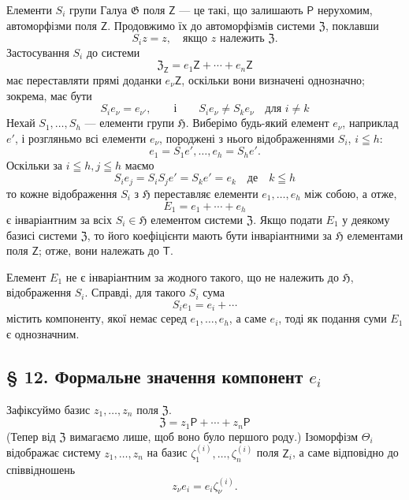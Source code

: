 \documentclass[11pt]{article}
\begin{document}
Елементи \(S_i\) групи Галуа \(\mathfrak G\) поля \(\mathsf Z\) --- це такі, що залишають \(\mathsf P\) нерухомим, автоморфізми поля \(\mathsf Z\). Продовжимо їх до автоморфізмів системи \(\mathfrak Z\), поклавши
\[
S_i z=z,\quad \text{якщо } z \text{ належить } \mathfrak Z.
\]
Застосування \(S_i\) до системи
\[
\mathfrak Z_{\mathsf Z}=e_1\mathsf Z+\cdots+e_n\mathsf Z
\]
має переставляти прямі доданки \(e_\nu\mathsf Z\), оскільки вони визначені однозначно; зокрема, має бути
\[
S_i e_\nu=e_{\nu'},\qquad\text{і}\qquad S_i e_\nu\ne S_k e_\nu
\quad\text{для } i\ne k
\]
Нехай \(S_1,\ldots,S_h\) --- елементи групи \(\mathfrak H\). Виберімо будь-який елемент \(e_\nu\), наприклад \(e'\), і розгляньмо всі елементи \(e_\nu\), породжені з нього відображеннями \(S_i\), \(i\leqq h\):
\[
e_1=S_1e',\ldots,e_h=S_he'.
\]
Оскільки за \(i\leqq h, j\leqq h\) маємо
\[
S_i e_j=S_iS_j e'=S_ke'=e_k \quad \text{де}\quad k\leqq h
\]
то кожне відображення \(S_i\) з \(\mathfrak H\) переставляє елементи \(e_1,\ldots,e_h\) між собою, а отже,
\[
E_1=e_1+\cdots+e_h
\]
є інваріантним за всіх \(S_i\in\mathfrak H\) елементом системи \(\mathfrak Z\). Якщо подати \(E_1\) у деякому базисі системи \(\mathfrak Z\), то його коефіцієнти мають бути інваріантними за \(\mathfrak H\) елементами поля \(\mathsf Z\); отже, вони належать до \(\mathsf T\).

Елемент \(E_1\) не є інваріантним за жодного такого, що не належить до \(\mathfrak H\), відображення \(S_i\). Справді, для такого \(S_i\) сума
\[
S_i e_1=e_i+\cdots
\]
містить компоненту, якої немає серед \(e_1,\ldots,e_h\), а саме \(e_i\), тоді як подання суми \(E_1\) є однозначним.

\subsection*{§ 12. Формальне значення компонент \(e_i\)}\label{die-formale-bedeutung-der-komponenten-ei}

Зафіксуймо базис \(z_1,\ldots,z_n\) поля \(\mathfrak Z\).
\[
\mathfrak Z=z_1\mathsf P+\cdots+z_n\mathsf P
\]
(Тепер від \(\mathfrak Z\) вимагаємо лише, щоб воно було першого роду.) Ізоморфізм \(\Theta_i\) відображає систему \(z_1,\ldots,z_n\) на базис \(\zeta_1^{(i)},\ldots,\zeta_n^{(i)}\) поля \(\mathsf Z_i\), а саме відповідно до співвідношень
\[
z_\nu e_i=e_i\zeta_\nu^{(i)} .
\]
\end{document}
